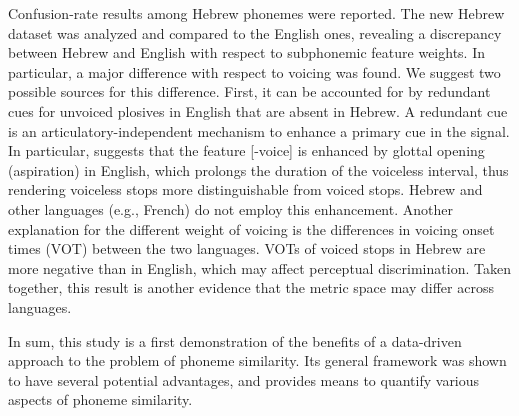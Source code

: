 Confusion-rate results among Hebrew phonemes were reported. The new Hebrew dataset was analyzed and compared to the English ones, revealing a discrepancy between Hebrew and English with respect to subphonemic feature weights. In particular, a major difference with respect to voicing was found. We suggest two possible sources for this difference. First, it can be accounted for by redundant cues for unvoiced plosives in English that are absent in Hebrew. A redundant cue is an articulatory-independent mechanism to enhance a primary cue in the signal. In particular, \citet{stevens1989primary} suggests that the feature [-voice] is enhanced by glottal opening (aspiration) in English, which prolongs the duration of the voiceless interval, thus rendering voiceless stops more distinguishable from voiced stops. Hebrew and other languages (e.g., French) do not employ this enhancement. Another explanation for the different weight of voicing is the differences in voicing onset times (VOT) \citep{Laufer1998} between the two languages. VOTs of voiced stops in Hebrew are more negative than in English, which may affect perceptual discrimination.  Taken together, this result is another evidence that the metric space may
differ across languages.


In sum, this study is a first demonstration of the benefits of a data-driven approach to the problem of phoneme similarity. Its general framework was shown to have several potential advantages, and provides means to quantify various aspects of phoneme similarity.